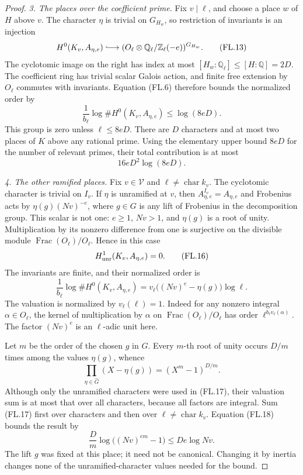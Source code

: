 \begin{proof}
\emph{3. The places over the coefficient prime.}
Fix \(v\mid\ell\), and choose a place \(w\) of \(H\)
above \(v\).  The character \(\eta\) is trivial on
\(G_{H_w}\), so restriction of invariants is an injection
\[
 H^0(K_v,A_{\eta,e})
       \lhook\joinrel\longrightarrow
 (O_\ell\otimes\mathbb Q_\ell/\mathbb Z_\ell(-e))^{G_{H_w}} .
 \tag{FL.13}
\]
The cyclotomic image on the right has index at most
\([H_w:\mathbb Q_\ell]\leq[H:\mathbb Q]=2D\).
The coefficient ring has trivial scalar Galois action,
and finite free extension by \(O_\ell\) commutes with
invariants.  Equation (FL.6) therefore bounds the
normalized order by
\[
 \frac1{b_\ell}\log\#H^0(K_v,A_{\eta,e})
                    \leq\log(8eD).
 \tag{FL.14}
\]
This group is zero unless \(\ell\leq8eD\).
There are \(D\) characters and at most two places
of \(K\) above any rational prime.
Using the elementary upper bound \(8eD\) for the number
of relevant primes, their total contribution is at most
\[
                         16eD^2\log(8eD).
 \tag{FL.15}
\]

\emph{4. The other ramified places.}
Fix \(v\in\mathcal V\) and \(\ell\ne\operatorname{char}k_v\).
The cyclotomic character is trivial on \(I_v\).
If \(\eta\) is unramified at \(v\), then
\(A_{\eta,e}^{I_v}=A_{\eta,e}\) and Frobenius acts by
\(\eta(g)(Nv)^{-e}\), where \(g\in G\) is any lift of
Frobenius in the decomposition group.
This scalar is not one: \(e\geq1\), \(Nv>1\), and
\(\eta(g)\) is a root of unity.
Multiplication by its nonzero difference from one is
surjective on the divisible module
\(\operatorname{Frac}(O_\ell)/O_\ell\).
Hence in this case
\[
                         H^1_{\rm unr}(K_v,A_{\eta,e})=0.
 \tag{FL.16}
\]
The invariants are finite, and their normalized order is
\[
 \frac1{b_\ell}\log\#H^0(K_v,A_{\eta,e})
     =v_\ell\bigl((Nv)^e-\eta(g)\bigr)\log\ell .
 \tag{FL.17}
\]
The valuation is normalized by \(v_\ell(\ell)=1\).
Indeed for any nonzero integral \(\alpha\in O_\ell\),
the kernel of multiplication by \(\alpha\) on
\(\operatorname{Frac}(O_\ell)/O_\ell\) has order
\(\ell^{b_\ell v_\ell(\alpha)}\).
The factor \((Nv)^e\) is an \(\ell\)-adic unit here.

Let \(m\) be the order of the chosen \(g\) in \(G\).
Every \(m\)-th root of unity occurs \(D/m\) times
among the values \(\eta(g)\), whence
\[
             \prod_{\eta\in\widehat G}(X-\eta(g))
                            =(X^m-1)^{D/m}.
 \tag{FL.18}
\]
Although only the unramified characters were used in
(FL.17), their valuation sum is at most that over all
characters, because all factors are integral.
Sum (FL.17) first over characters and then over
\(\ell\ne\operatorname{char}k_v\).
Equation (FL.18) bounds the result by
\[
           \frac Dm\log\bigl((Nv)^{em}-1\bigr)
                            \leq De\log Nv .
 \tag{FL.19}
\]
The lift \(g\) was fixed at this place; it need not be
canonical.  Changing it by inertia changes none of
the unramified-character values needed for the bound.


\end{proof}
